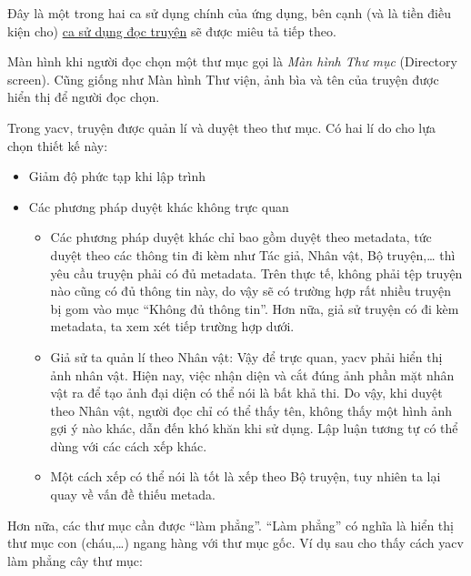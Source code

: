 Đây là một trong hai ca sử dụng chính của ứng dụng, bên cạnh (và là tiền
điều kiện cho) \protect\hyperlink{P3.3.3-read-comic}{ca sử dụng đọc
  truyện} sẽ được miêu tả tiếp theo.

Màn hình khi người đọc chọn một thư mục gọi là \emph{Màn hình Thư mục}
(Directory screen). Cũng giống như Màn hình Thư viện, ảnh bìa và tên của
truyện được hiển thị để người đọc chọn.

Trong yacv, truyện được quản lí và duyệt theo thư mục. Có hai lí do cho
lựa chọn thiết kế này:

\begin{itemize}
  \item
        Giảm độ phức tạp khi lập trình
  \item
        Các phương pháp duyệt khác không trực quan

        \begin{itemize}
          
          \item
                Các phương pháp duyệt khác chỉ bao gồm duyệt theo metadata, tức
                duyệt theo các thông tin đi kèm như Tác giả, Nhân vật, Bộ
                truyện,\ldots{} thì yêu cầu truyện phải có đủ metadata. Trên thực
                tế, không phải tệp truyện nào cũng có đủ thông tin này, do vậy sẽ có
                trường hợp rất nhiều truyện bị gom vào mục ``Không đủ thông tin''.
                Hơn nữa, giả sử truyện có đi kèm metadata, ta xem xét tiếp trường
                hợp dưới.
          \item
                Giả sử ta quản lí theo Nhân vật: Vậy để trực quan, yacv phải hiển
                thị ảnh nhân vật. Hiện nay, việc nhận diện và cắt đúng ảnh phần mặt
                nhân vật ra để tạo ảnh đại diện có thể nói là bất khả thi. Do vậy,
                khi duyệt theo Nhân vật, người đọc chỉ có thể thấy tên, không thấy
                một hình ảnh gợi ý nào khác, dẫn đến khó khăn khi sử dụng. Lập luận
                tương tự có thể dùng với các cách xếp khác.
          \item
                Một cách xếp có thể nói là tốt là xếp theo Bộ truyện, tuy nhiên ta
                lại quay về vấn đề thiếu metada.
        \end{itemize}
\end{itemize}

Hơn nữa, các thư mục cần được ``làm phẳng''. ``Làm phẳng'' có nghĩa là
hiển thị thư mục con (cháu,\ldots) ngang hàng với thư mục gốc. Ví dụ sau
cho thấy cách yacv làm phẳng cây thư mục:

